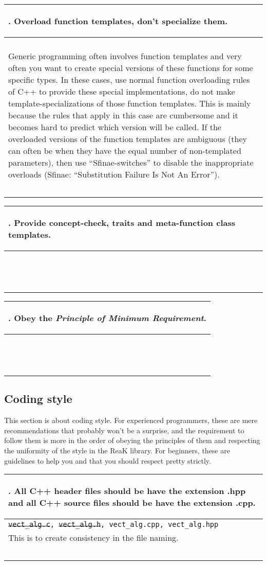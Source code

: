 \documentclass[10pt]{article}
\newcommand{\code}[1]{\color[rgb]{0.2,0.8,0.2}\texttt{#1}\color[rgb]{0,0,0} }
\newcounter {iCommandment}
\newcommand{\CorG}[5]
{
\begin{table}[H]
\begin{center}
\begin{tabular}{| p{12cm} |}
\hline
#1. #2 \\
\hline
\vspace{-0.1cm}
\parbox{12cm}{\code{#3}} \\
\vspace{-0.2cm}
#4 \\
#5 \\
\hline
\end{tabular}
\end{center}
\end{table}
}
\newcommand{\Commandment}[4]
{
\CorG{\textbf{\arabic{iCommandment}}\addtocounter{iCommandment}{1}}
{\textbf{#1}}{#2}{#3}{#4}
}
\begin{document}
\Commandment
{Overload function templates, don't specialize them.}
{\ }
{Generic programming often involves function templates and very often you want to create special versions 
of these functions for some specific types. In these cases, use normal function overloading rules of C++ to 
provide these special implementations, do not make template-specializations of those function templates. This is
mainly because the rules that apply in this case are cumbersome and it becomes hard to predict which version 
will be called. If the overloaded versions of the function templates are ambiguous (they can often be when they 
have the equal number of non-templated parameters), then use ``Sfinae-switches'' to disable the inappropriate 
overloads (Sfinae: ``Substitution Failure Is Not An Error'').}
{\ }

\Commandment
{Provide concept-check, traits and meta-function class templates.}
{\ }
{\ }
{\ }

\Commandment
{Obey the \textit{Principle of Minimum Requirement}.}
{\ }
{\ }
{\ }

\subsection{Coding style}

This section is about coding style. For experienced programmers, these are mere recommendations that probably 
won't be a surprise, and the requirement to follow them is more in the order of obeying the principles of them 
and respecting the uniformity of the style in the ReaK library. For beginners, these are guidelines to help you and 
that you should respect pretty strictly.

\Commandment
{All C++ header files should be have the extension .hpp and all C++ source files should be have the extension .cpp.}
{\sout{vect\_alg.c}, \sout{vect\_alg.h}, vect\_alg.cpp, vect\_alg.hpp }
{This is to create consistency in the file naming.}
{\ }
\end{document}
